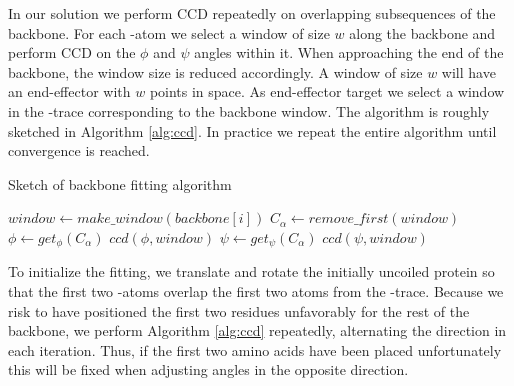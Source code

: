 In our solution we perform CCD repeatedly on overlapping subsequences of the backbone.
For each \Ca-atom we select a window of size $w$ along the backbone and perform CCD on the $\phi$ and $\psi$ angles within it.
When approaching the end of the backbone, the window size is reduced accordingly.
A window of size $w$ will have an end-effector with $w$ points in space.
As end-effector target we select a window in the \Ca-trace corresponding to the backbone window. 
The algorithm is roughly sketched in Algorithm \ref{alg:ccd}.
In practice we repeat the entire algorithm until convergence is reached.

\begin{algorithm}
\caption{Sketch of backbone fitting algorithm}
\label{alg:ccd}
\begin{algorithmic}
			\STATE $window \gets make\_window(backbone[i])$
				\STATE $C_\alpha \gets remove\_first(window)$
				\STATE $\phi \gets get_\phi(C_\alpha)$
				\STATE $ccd(\phi,window)$
				\STATE $\psi \gets get_\psi(C_\alpha)$
				\STATE $ccd(\psi,window)$
			\ENDWHILE
		\ENDFOR
	\ENDFOR
\end{algorithmic}
\end{algorithm}



To initialize the fitting, we translate and rotate the initially uncoiled protein so that the first two \Ca-atoms overlap the first two atoms from the \Ca-trace.
Because we risk to have positioned the first two residues unfavorably for the rest of the backbone, we perform Algorithm \ref{alg:ccd} repeatedly, alternating the direction in each iteration.
Thus, if the first two amino acids have been placed unfortunately this will be fixed when adjusting angles in the opposite direction.









